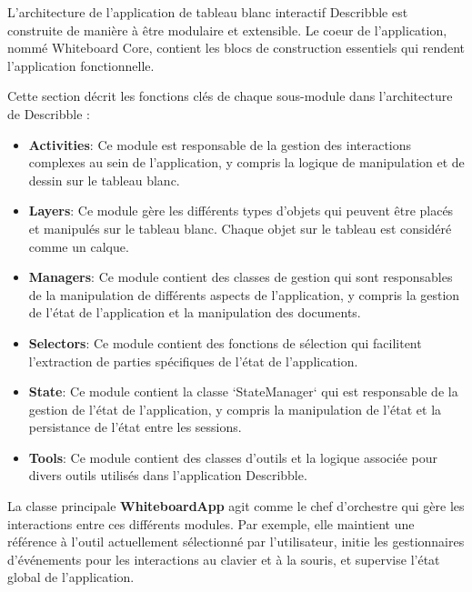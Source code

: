 L'architecture de l'application de tableau blanc interactif \Gls{Describble} est construite de manière à être modulaire et extensible. Le coeur de l'application, nommé \guillemotleft Whiteboard Core\guillemotright, contient les blocs de construction essentiels qui rendent l'application fonctionnelle.

Cette section décrit les fonctions clés de chaque sous-module dans l'architecture de \Gls{Describble} :

\begin{itemize}
    \item \textbf{Activities}: Ce module est responsable de la gestion des interactions complexes au sein de l'application, y compris la logique de manipulation et de dessin sur le tableau blanc.

    \item \textbf{Layers}: Ce module gère les différents types d'objets qui peuvent être placés et manipulés sur le tableau blanc. Chaque objet sur le tableau est considéré comme un calque.

    \item \textbf{Managers}: Ce module contient des classes de gestion qui sont responsables de la manipulation de différents aspects de l'application, y compris la gestion de l'état de l'application et la manipulation des documents.

    \item \textbf{Selectors}: Ce module contient des fonctions de sélection qui facilitent l'extraction de parties spécifiques de l'état de l'application.

    \item \textbf{State}: Ce module contient la classe `StateManager` qui est responsable de la gestion de l'état de l'application, y compris la manipulation de l'état et la persistance de l'état entre les sessions.

    \item \textbf{Tools}: Ce module contient des classes d'outils et la logique associée pour divers outils utilisés dans l'application \Gls{Describble}.
\end{itemize}

La classe principale \textbf{WhiteboardApp}  agit comme le chef d'orchestre qui gère les interactions entre ces différents modules. Par exemple, elle maintient une référence à l'outil actuellement sélectionné par l'utilisateur, initie les gestionnaires d'événements pour les interactions au clavier et à la souris, et supervise l'état global de l'application.

